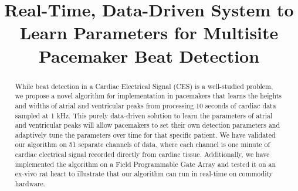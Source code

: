 \documentclass[conference]{IEEEtran}
\begin{document}
%
\title{Real-Time, Data-Driven System to Learn
Parameters for Multisite Pacemaker Beat Detection}


\author{
}







\maketitle

\begin{abstract}
While beat detection in a Cardiac Electrical 
Signal (CES) is a well-studied problem, we propose a novel
algorithm for implementation in pacemakers that learns the
heights and widths of atrial and ventricular peaks from
processing 10 seconds of cardiac data sampled at 1 kHz. 
This purely data-driven solution to learn the parameters of atrial
and ventricular peaks will allow pacemakers to set their own 
detection parameters and adaptively tune
the parameters over time for that specific patient.
We have validated our algorithm on 51 separate channels of
data, where each channel is one minute of cardiac electrical signal recorded directly from cardiac tissue.
Additionally, we have implemented the algorithm on a
Field Programmable Gate Array and tested it on an ex-vivo rat
heart to illustrate that our algorithm can run in real-time on commodity hardware.
\end{abstract}
\end{document}
